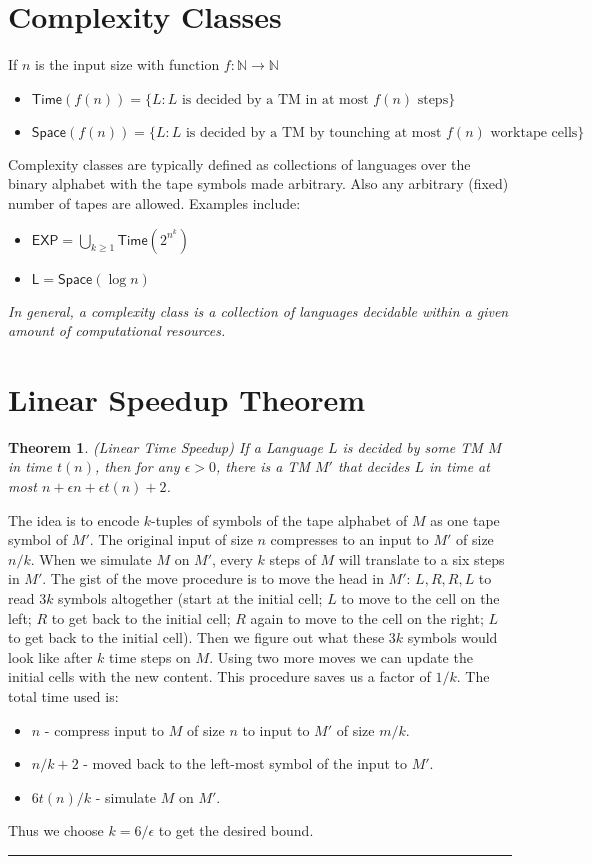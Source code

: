 \documentclass[twoside]{article}
\newcounter{lecnum}
\newtheorem{theorem}{Theorem}[lecnum]
\newenvironment{proof}{{\bf Proof:}}{\hfill\rule{2mm}{2mm}}
\def\N{\mathbb{N}}
\begin{document}
\section{Complexity Classes}
If $n$ is the input size with function $f: \N \rightarrow \N$
\begin{itemize}
\item $\mathsf{Time}(f(n)) = \{L: L \mbox{ is decided by a TM in at most } f(n) \mbox{ steps}\}$
\item $\mathsf{Space}(f(n)) = \{L: L \mbox{ is decided by a TM by tounching at most } f(n) \mbox{ worktape cells}\}$
\end{itemize}
Complexity classes are typically defined as collections of languages over the binary alphabet with the tape symbols made arbitrary. Also any arbitrary (fixed) number of tapes are allowed. Examples include:
\begin{itemize}
\item $\mathsf{EXP} = \bigcup_{k \geq 1} \mathsf{Time}(2^{n^k})$
\item $\mathsf{L} = \mathsf{Space}(\log n)$
\end{itemize}
\emph{In general, a complexity class is a collection of languages decidable within  a given amount of computational resources.}


\section{Linear Speedup Theorem}
\begin{theorem}
(Linear Time Speedup) If a Language $L$ is decided by some TM $M$ in time $t(n)$, then for any $\epsilon > 0$, there is a TM $M'$ that decides $L$ in time at most $n + \epsilon n +  \epsilon t(n) + 2$.
\end{theorem}
\begin{proof}
The idea is to encode $k$-tuples of symbols of the tape alphabet of $M$ as one tape symbol of $M'$. The original input of size $n$ compresses to an input to $M'$ of size $n/k$. When we simulate $M$ on $M'$, every $k$ steps of $M$ will translate to a six steps in $M'$. The gist of the move procedure is to move the head in $M'$: $L, R, R, L$ to read $3k$ symbols altogether (start at the initial cell; $L$ to move to the cell on the left; $R$ to get back to the initial cell; $R$ again to move to the cell on the right; $L$ to get back to the initial cell). Then we figure out what these $3k$ symbols would look like after $k$ time steps on $M$. Using two more moves we can update the initial cells with the new content. This procedure saves us a factor of $1/k$. The total time used is:
\begin{itemize}
\item $n$ - compress input to $M$ of size $n$ to input to $M'$ of size $m/k$. 
\item $n/k + 2$ - moved back to the left-most symbol of the input to $M'$. 
\item $6t(n)/k$ - simulate $M$ on $M'$.
\end{itemize} 
Thus we choose $k = 6/\epsilon$ to get the desired bound. 
\end{proof}
\end{document}
